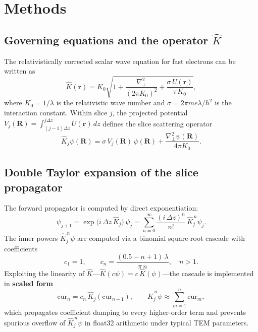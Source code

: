 \documentclass[twoside,11pt]{article}
\begin{document}
\section{Methods}

\subsection{Governing equations and the operator $\hat{K}$}

The relativistically corrected scalar wave equation for fast electrons can be written as~\cite{ChenVanDyck1997}
\begin{equation}\label{eq:KE}
\hat{K}(\mathbf{r})=K_0\sqrt{1+\frac{\nabla_\perp^2}{(2\pi K_0)^2}+\frac{\sigma\,U(\mathbf{r})}{\pi K_0}},
\end{equation}
where $K_0=1/\lambda$ is the relativistic wave number and $\sigma=2\pi m e\lambda/h^2$ is the interaction constant. Within slice $j$, the projected potential $V_j(\mathbf{R})=\int_{(j-1)\Delta z}^{j\Delta z}U(\mathbf{r})\,dz$ defines the slice scattering operator
\begin{equation}\label{eq:Kj}
\hat{K}_j\psi(\mathbf{R})=\sigma\,V_j(\mathbf{R})\,\psi(\mathbf{R})+\frac{\nabla_\perp^2\psi(\mathbf{R})}{4\pi K_0}.
\end{equation}

\subsection{Double Taylor expansion of the slice propagator}

The forward propagator is computed by direct exponentiation:
\begin{equation}\label{eq:taylor}
\psi_{j+1}=\exp\!\big(i\,\Delta z\,\hat{K}_j\big)\,\psi_j
=\sum_{n=0}^{\infty}\frac{(i\,\Delta z)^n}{n!}\,\hat{K}_j^{\,n}\psi_j.
\end{equation}
The inner powers $\hat{K}_j^{\,n}\psi$ are computed via a binomial square-root cascade with coefficients
\begin{equation}\label{eq:cn}
c_1=1,\qquad c_n=\frac{(0.5-n+1)\,\lambda}{\pi\,n},\quad n>1.
\end{equation}
Exploiting the linearity of $\hat{K}$---$\hat{K}(c\psi)=c\,\hat{K}(\psi)$---the cascade is implemented in \textbf{scaled form}
\begin{equation}\label{eq:cascade}
\mathrm{cur}_n=c_n\,\hat{K}_j(\mathrm{cur}_{n-1}),\qquad
\hat{K}_j^{\,n}\psi\approx\sum_{m=1}^{n}\mathrm{cur}_m,
\end{equation}
which propagates coefficient damping to every higher-order term and prevents spurious overflow of $\hat{K}_j^{\,n}\psi$ in float32 arithmetic under typical TEM parameters.
\end{document}
